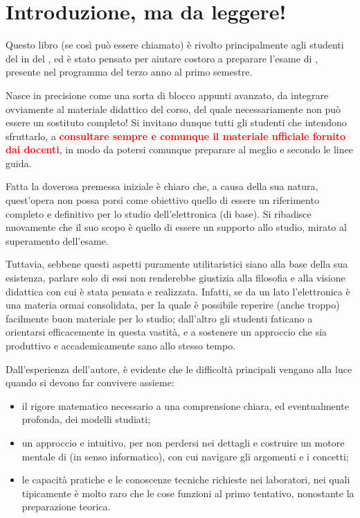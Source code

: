 \chapter{Introduzione, ma da leggere!}
Questo libro (se così può essere chiamato) è rivolto principalmente agli studenti
del \course{} in \emph{\prog} del \emph{\uni}, ed è stato pensato per aiutare
costoro a preparare l'esame di \emph{\DDcoursename}, presente nel programma del
terzo anno al primo semestre.

Nasce in precisione come una sorta di blocco appunti avanzato, da integrare
ovviamente al materiale didattico del corso, del quale necessariamente non può
essere un sostituto completo! Si invitano dunque tutti gli studenti che
intendono sfruttarlo, a \textcolor{Red}{\textbf{consultare sempre e comunque il
materiale ufficiale fornito dai docenti}}, in modo da potersi comunque preparare
al meglio e secondo le linee guida.

Fatta la doverosa premessa iniziale è chiaro che, a causa della sua natura,
quest'opera non possa porsi come obiettivo quello di essere un riferimento
completo e definitivo per lo studio dell'elettronica (di base). Si ribadisce
nuovamente che il suo scopo è quello di essere un supporto allo studio, mirato
al superamento dell'esame.

Tuttavia, sebbene questi aspetti puramente utilitaristici siano alla base della
sua esistenza, parlare solo di essi non renderebbe giustizia alla filosofia e
alla visione didattica con cui è stata pensata e realizzata. Infatti, se da un
lato l'elettronica è una materia ormai consolidata, per la quale è possibile
reperire (anche troppo) facilmente buon materiale per lo studio; dall'altro gli
studenti faticano a orientarsi efficacemente in questa vastità, e a sostenere un
approccio che sia produttivo e accademicamente sano allo stesso tempo.

Dall'esperienza dell'autore, è evidente che le difficoltà principali vengano
alla luce quando si devono far convivere assieme:
\begin{itemize}
\item il rigore matematico necessario a una comprensione chiara, ed
eventualmente profonda, dei modelli studiati;
\item un approccio  e intuitivo, per non perdersi nei dettagli e
costruire un motore mentale di  (in senso informatico), con
cui navigare gli argomenti e i concetti;
\item le capacità pratiche e le conoscenze tecniche richieste nei laboratori,
nei quali tipicamente è molto raro che le cose funzioni al primo tentativo,
nonostante la preparazione teorica.
\end{itemize}

